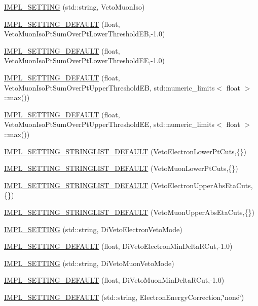 \begin{DoxyCompactItemize}
\item 
\hyperlink{classHttSettings_a3a13d1b4ee69f3334d779ce4b9aba0f9}{IMPL\_\-SETTING} (std::string, VetoMuonIso)
\item 
\hyperlink{classHttSettings_af048269f33df9f02ef46e9d64d860d0d}{IMPL\_\-SETTING\_\-DEFAULT} (float, VetoMuonIsoPtSumOverPtLowerThresholdEB,-\/1.0)
\item 
\hyperlink{classHttSettings_aa87e155f0a156b6c2005e32d65ff6c0e}{IMPL\_\-SETTING\_\-DEFAULT} (float, VetoMuonIsoPtSumOverPtLowerThresholdEE,-\/1.0)
\item 
\hyperlink{classHttSettings_adea4499dc516f7cfd438e703d50b76ac}{IMPL\_\-SETTING\_\-DEFAULT} (float, VetoMuonIsoPtSumOverPtUpperThresholdEB, std::numeric\_\-limits$<$ float $>$::max())
\item 
\hyperlink{classHttSettings_ad2400b8e6df12ee3dffd42c80a2b5025}{IMPL\_\-SETTING\_\-DEFAULT} (float, VetoMuonIsoPtSumOverPtUpperThresholdEE, std::numeric\_\-limits$<$ float $>$::max())
\item 
\hyperlink{classHttSettings_ad96b23461ccea7e7983ff584eda33824}{IMPL\_\-SETTING\_\-STRINGLIST\_\-DEFAULT} (VetoElectronLowerPtCuts,\{\})
\item 
\hyperlink{classHttSettings_aeb8a93b9a912f8e04e639c8b85f128ef}{IMPL\_\-SETTING\_\-STRINGLIST\_\-DEFAULT} (VetoMuonLowerPtCuts,\{\})
\item 
\hyperlink{classHttSettings_a780edfbc710a9b491ed7537ead27225a}{IMPL\_\-SETTING\_\-STRINGLIST\_\-DEFAULT} (VetoElectronUpperAbsEtaCuts,\{\})
\item 
\hyperlink{classHttSettings_a8b698b24a00bf7a7d9f7cba39c21458b}{IMPL\_\-SETTING\_\-STRINGLIST\_\-DEFAULT} (VetoMuonUpperAbsEtaCuts,\{\})
\item 
\hyperlink{classHttSettings_a2ab5b01575a9c20f5b3f484a923b9175}{IMPL\_\-SETTING} (std::string, DiVetoElectronVetoMode)
\item 
\hyperlink{classHttSettings_a11d0797ee5f15ceedc51c0c83b097dcb}{IMPL\_\-SETTING\_\-DEFAULT} (float, DiVetoElectronMinDeltaRCut,-\/1.0)
\item 
\hyperlink{classHttSettings_a614b9f9a6448fcd0eae1d09a75e1723c}{IMPL\_\-SETTING} (std::string, DiVetoMuonVetoMode)
\item 
\hyperlink{classHttSettings_ac82d12116eac0c155589c0040238bcc3}{IMPL\_\-SETTING\_\-DEFAULT} (float, DiVetoMuonMinDeltaRCut,-\/1.0)
\item 
\hyperlink{classHttSettings_ae56fd4ee1a4ba1dfad77905b9106a538}{IMPL\_\-SETTING\_\-DEFAULT} (std::string, ElectronEnergyCorrection,\char`\"{}none\char`\"{})

\end{DoxyCompactItemize}
